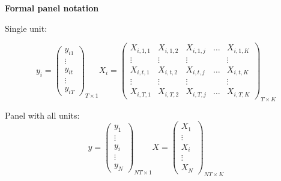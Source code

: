 \documentclass[notes=show]{beamer}
\begin{document}
\begin{frame}[plain]
	\begin{center}
	\textbf{Formal panel notation}
	\end{center}
Single unit:

\[ y_i = \left( \begin{array}{c}
y_{i1} \\
\vdots \\
y_{it} \\
\vdots \\
y_{iT}
\end{array} \right)_{T\times 1}
%
X_i = \left( \begin{array}{ccccc}
X_{i,1,1} & X_{i,1,2} & X_{i,1,j} & \dots & X_{i,1,K} \\
\vdots & \vdots & \vdots & & \vdots \\
X_{i,t,1} & X_{i,t,2} & X_{i,t,j} & \dots & X_{i,t,K} \\
\vdots & \vdots & \vdots & & \vdots \\
X_{i,T,1} & X_{i,T,2} & X_{i,T,j} & \dots & X_{i,T,K} 
\end{array} \right)_{T\times K}
\]

Panel with all units:
\[ y = \left( \begin{array}{c}
y_{1} \\
\vdots \\
y_{i} \\
\vdots \\
y_{N}
\end{array} \right)_{NT\times 1}
%
X = \left( \begin{array}{c}
X_1  \\
\vdots \\
X_i \\
\vdots \\
X_N
\end{array} \right)_{NT \times K}
\]


\end{frame}
\end{document}
